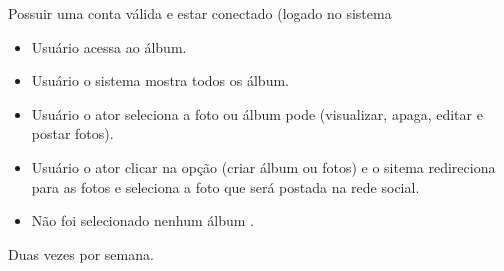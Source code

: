  {Possuir uma conta válida e estar conectado (logado no sistema}
{}
{
\begin{itemize}
	\item Usuário acessa ao álbum.
	\item Usuário o sistema mostra todos os álbum.
	\item Usuário o ator seleciona a foto ou álbum pode (visualizar, apaga, editar e postar fotos).
	\item Usuário o ator clicar na opção (criar álbum ou fotos) e o sitema redireciona para as fotos e seleciona a foto que será postada na rede social.
\end{itemize}
}
{
\begin{itemize}
	\item Não foi selecionado nenhum álbum .

\end{itemize}
}
{Duas vezes por semana.}
{

}

